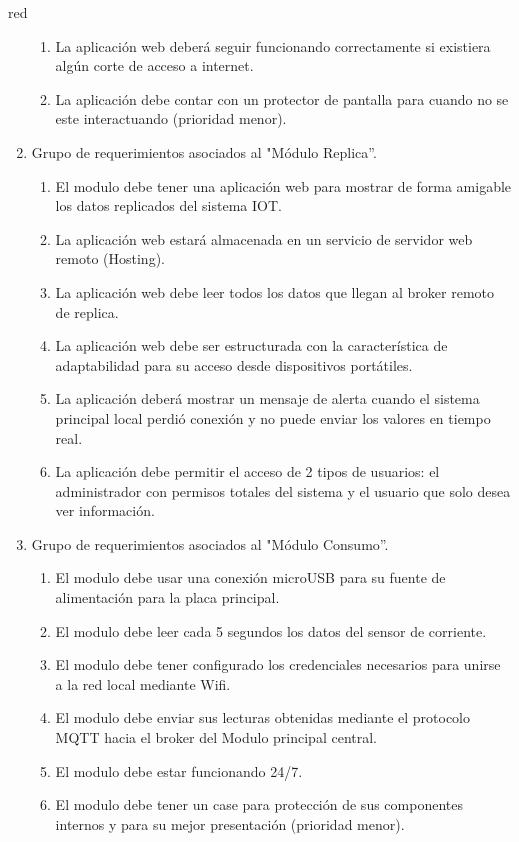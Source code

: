 \documentclass[11pt]{charter}
\begin{document}
\begin{consigna}{red}
\begin{enumerate}
\begin{enumerate}
	\item La aplicación web deberá seguir funcionando correctamente si existiera algún corte de acceso a internet.
	\item La aplicación debe contar con un protector de pantalla para cuando no se este interactuando (prioridad menor).
	\end{enumerate}
\item Grupo de requerimientos asociados al "Módulo Replica''.
	\begin{enumerate}
	\item El modulo debe tener una aplicación web para mostrar de forma amigable los datos replicados del sistema IOT.
	\item La aplicación web estará almacenada en un servicio de servidor web remoto (Hosting).
	\item La aplicación web debe leer todos los datos que llegan al broker remoto de replica.
	\item La aplicación web debe ser estructurada con la característica de adaptabilidad para su acceso desde dispositivos portátiles.
	\item La aplicación deberá mostrar un mensaje de alerta cuando el sistema principal local perdió conexión y no puede enviar los valores en tiempo real.
	\item La aplicación debe permitir el acceso de 2 tipos de usuarios: el administrador con permisos totales del sistema y el usuario que solo desea ver información.
	\end{enumerate}
\item Grupo de requerimientos asociados al "Módulo Consumo''.
	\begin{enumerate}
	\item El modulo debe usar una conexión microUSB para su fuente de alimentación para la placa principal.
	\item El modulo debe leer cada 5 segundos los datos del sensor de corriente.
	\item El modulo debe tener configurado los credenciales necesarios para unirse a la red local mediante Wifi.
	\item El modulo debe enviar sus lecturas obtenidas mediante el protocolo MQTT hacia el broker del Modulo principal central.
	\item El modulo debe estar funcionando 24/7.
	\item El modulo debe tener un case para protección de sus componentes internos y para su mejor presentación (prioridad menor).

\end{enumerate}
\end{enumerate}
\end{consigna}
\end{document}
